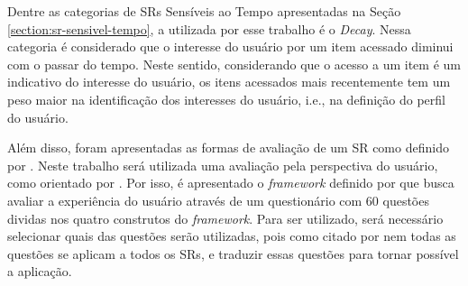 Dentre as categorias de SRs Sensíveis ao Tempo apresentadas na Seção \ref{section:sr-sensivel-tempo}, a utilizada por esse
trabalho é o \textit{Decay}. Nessa categoria é considerado que o interesse do usuário por um item acessado diminui com o passar
do tempo. Neste sentido, considerando que o acesso a um item é um indicativo do interesse do usuário, os itens acessados
mais recentemente tem um peso maior na identificação dos interesses do usuário, i.e., na definição do perfil do usuário.

Além disso, foram apresentadas as formas de avaliação de um SR como definido por . Neste
trabalho será utilizada uma avaliação pela perspectiva do usuário, como orientado por . Por isso, é
apresentado o \textit{framework} definido por  que busca avaliar a experiência do usuário através de um
questionário com 60 questões dividas nos quatro construtos do \textit{framework}. Para ser utilizado, será necessário
selecionar quais das questões serão utilizadas, pois como citado por  nem todas as questões se
aplicam a todos os SRs, e traduzir essas questões para tornar possível a aplicação.
